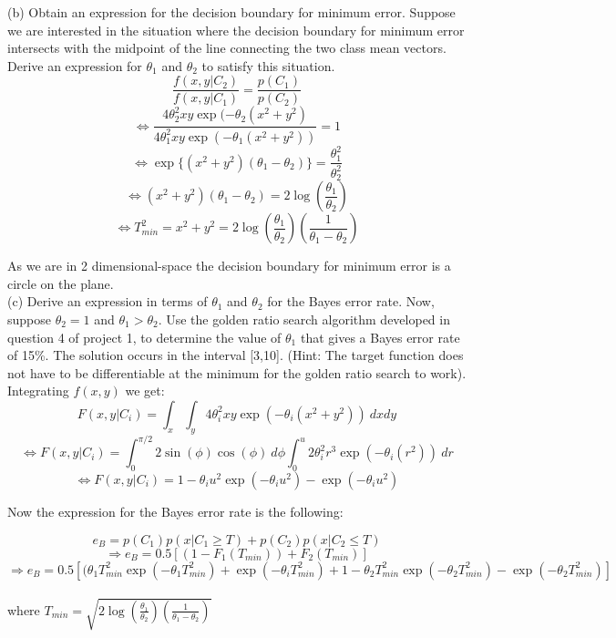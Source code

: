 \documentclass{article}
\begin{document}
(b) Obtain an expression for the decision boundary for minimum error. Suppose we are interested in the situation where the decision boundary for minimum error intersects with the midpoint of the line connecting the two class mean vectors. Derive an expression for $\theta_{1}$ and $\theta_{2}$ to satisfy this situation. \\

$$ \frac{ f(x,y|C_{2})}{f(x,y|C_{1})}=\frac{p(C_{1}) }{p(C_{2} )}$$
$$ \Leftrightarrow \frac{ 4\theta_{2}^2xy\exp(-\theta_{2}(x^2+y^2)}{4\theta_{1}^2xy\exp(-\theta_{1}(x^2+y^2))}=1$$
$$\Leftrightarrow  \exp\{(x^2+y^2)(\theta_{1}-\theta_{2})\}=\frac{ \theta_{1}^2}{\theta_{2}^2}$$
$$\Leftrightarrow (x^2+y^2)(\theta_{1}-\theta_{2})=2\log(\frac{\theta_{1}}{\theta_{2}})$$
$$\Leftrightarrow T_{min}^2=x^2+y^2=2\log(\frac{\theta_{1}}{\theta_{2}})(\frac{1}{\theta_{1}-\theta_{2}})$$

As we are in 2 dimensional-space the decision boundary for minimum error is a circle on the plane. \\
 

(c) Derive an expression in terms of $\theta_{1}$ and $\theta_{2}$ for the Bayes error rate. Now, suppose $\theta_{2}=1$ and $\theta_{1}>\theta_{2}$. Use the golden ratio search algorithm developed in question 4 of project 1, to determine the value of $\theta_{1}$ that gives a Bayes error rate of 15\%. The solution occurs in the interval [3,10]. (Hint: The target function does not have to be differentiable at the minimum for the golden ratio search to work). \\

Integrating $f(x,y)$ we get: \\
$$F(x,y|C_{i})=\int_{x} \int_{y} 4\theta_{i}^2xy\exp(-\theta_{i}(x^2+y^2)) \ dx dy$$
$$\Leftrightarrow F(x,y|C_{i})=\int^{\pi/2}_{0} 2\sin(\phi)\cos(\phi) \ d\phi \int^{u}_{0} 2\theta_{i}^2r^3\exp(-\theta_{i}(r^2)) \ dr $$
$$\Leftrightarrow F(x,y|C_{i})=1-\theta_{i}u^2\exp(-\theta_{i}u^2)-\exp(-\theta_{i}u^2) $$

Now the expression for the Bayes error rate is the following: 

$$ e_{B}=p(C_{1})p(x |C_{1} \geq T)+p(C_{2})p(x|C_{2} \leq T)  $$
$$\Rightarrow e_{B}= 0.5 [(1-F_{1}(T_{min})) + F_{2}(T_{min})]$$
$$\Rightarrow e_{B}= 0.5 [(\theta_{1}T_{min}^2\exp(-\theta_{1}T_{min}^2)+\exp(-\theta_{i}T_{min}^2) + 1-\theta_{2}T_{min}^2\exp(-\theta_{2}T_{min}^2)-\exp(-\theta_{2}T_{min}^2)]$$
\\
where $T_{min}=\sqrt{2\log(\frac{\theta_{1}}{\theta_{2}})(\frac{1}{\theta_{1}-\theta_{2}})}$\\
\end{document}
